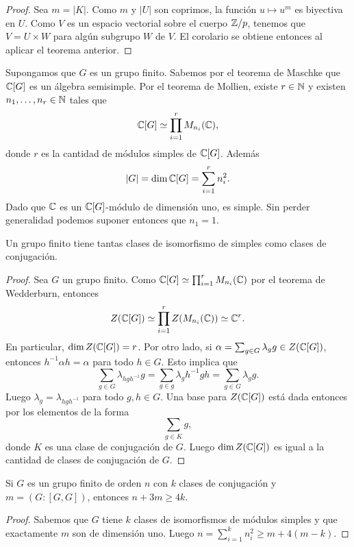 \begin{proof}
Sea $m=|K|$. Como $m$ y $|U|$ son coprimos, la función 
$u\mapsto u^m$ es biyectiva en $U$. Como $V$ es un espacio
vectorial sobre el cuerpo $\mathbb{Z}/p$, tenemos que
$V=U\times W$ para algún subgrupo $W$ de $V$. El corolario se obtiene
entonces al aplicar el teorema anterior.
\end{proof}

Supongamos que $G$ es un grupo finito. 
Sabemos por el teorema de Maschke que $\mathbb{C}[G]$ es un
álgebra semisimple. Por el teorema de Mollien, existe $r\in\mathbb{N}$ y
existen $n_1,\dots,n_r\in\mathbb{N}$ tales que 
\[
	\mathbb{C}[G]\simeq \prod_{i=1}^r M_{n_i}(\mathbb{C}),
\]
donde $r$ es la cantidad de módulos simples de $\mathbb{C}[G]$. 
Además 
\[
	|G|=\dim\mathbb{C}[G]=\sum_{i=1}^r n_i^2.
\]
Dado que $\mathbb{C}$ es un $\mathbb{C}[G]$-módulo de dimensión uno, es simple. 
Sin perder generalidad podemos suponer entonces
que $n_1=1$. 

\begin{theorem}
	Un grupo finito tiene tantas clases de isomorfismo de simples como clases
	de conjugación.
\end{theorem}

\begin{proof}
    Sea $G$ un grupo finito. Como $\mathbb{C}[G]\simeq\prod_{i=1}^rM_{n_i}(\mathbb{C})$ 
    por el teorema de Wedderburn,
	entonces
	\[
		Z(\mathbb{C}[G])\simeq\prod_{i=1}^rZ(M_{n_i}(\mathbb{C}))\simeq\mathbb{C}^r.
	\]
	En particular, $\dim Z(\mathbb{C}[G])=r$. Por otro lado, si $\alpha=\sum_{g\in
	G}\lambda_gg\in Z(\mathbb{C}[G])$, entonces $h^{-1}\alpha h=\alpha$ para todo $h\in
	G$. Esto implica que
	\[
		\sum_{g\in G}\lambda_{hgh^{-1}}g=
		\sum_{g\in g}\lambda_g h^{-1}gh=\sum_{g\in G}\lambda_gg.
	\]
	Luego $\lambda_{g}=\lambda_{hgh^{-1}}$ para todo $g,h\in G$. Una base para
	$Z(\mathbb{C}[G])$ está dada entonces por los elementos de la forma
	\[
		\sum_{g\in K}g,
	\]
	donde $K$ es una clase de conjugación de $G$. Luego $\dim Z(\mathbb{C}[G])$ es
	igual a la cantidad de clases de conjugación de $G$.
\end{proof}

\begin{corollary}
    Si $G$ es un grupo finito de orden $n$ con $k$ clases de conjugación y 
    $m=(G:[G,G])$, entonces $n+3m\geq 4k$. 
\end{corollary}

\begin{proof}
    Sabemos que $G$ tiene $k$ clases de isomorfismos de módulos simples y que exactamente 
    $m$ son de dimensión uno. Luego $n=\sum_{i=1}^kn_i^2\geq m+4(m-k)$. 
\end{proof}

